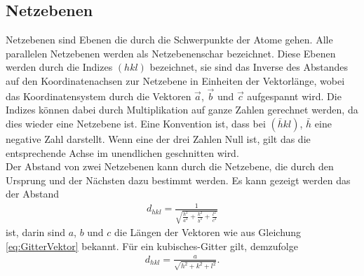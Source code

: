 \subsection{Netzebenen}
Netzebenen sind Ebenen die durch die Schwerpunkte der Atome gehen. Alle parallelen Netzebenen werden als Netzebenenschar bezeichnet. Diese Ebenen werden durch die Indizes $(hkl)$ bezeichnet, sie sind das Inverse des Abstandes auf den Koordinatenachsen zur Netzebene in Einheiten der Vektorlänge, wobei das Koordinatensystem durch die Vektoren $\vec{a}$, $\vec{b}$ und $\vec{c}$ aufgespannt wird. Die Indizes können dabei durch Multiplikation auf ganze Zahlen gerechnet werden, da dies wieder eine Netzebene ist. Eine Konvention ist, dass bei $(\bar{h}kl)$, $\bar{h}$ eine negative Zahl darstellt. Wenn eine der drei Zahlen Null ist, gilt das die entsprechende Achse im unendlichen geschnitten wird.\\
Der Abstand von zwei Netzebenen kann durch die Netzebene, die durch den Ursprung und der Nächsten dazu bestimmt werden. Es kann gezeigt werden das der Abstand 
\begin{align}
	d_{hkl}=\frac{1}{\sqrt{\frac{h^2}{a^2}+\frac{k^2}{b^2}+\frac{l^2}{c^2}}}
\end{align}
ist, darin sind $a$, $b$ und $c$ die Längen der Vektoren wie aus Gleichung \eqref{eq:GitterVektor} bekannt. Für ein kubisches-Gitter gilt, demzufolge 
\begin{align}
	d_{hkl}=\frac{a}{\sqrt{h^2+k^2+l^2}}.
\end{align}
